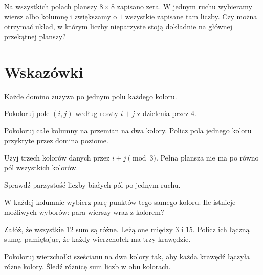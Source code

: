 \documentclass{lecture-kuznia}
\begin{document}
\begin{problem}[$\diamondsuit$]\label{Z15}
	Na wszystkich polach planszy $8\times8$ zapisano zera. W jednym ruchu
	wybieramy wiersz albo kolumnę i zwiększamy o $1$ wszystkie zapisane tam
	liczby. Czy można otrzymać układ, w którym liczby nieparzyste stoją
	dokładnie na głównej przekątnej planszy?
\end{problem}

\ifshowsolutions
\newpage
\section{Wskazówki}

\begin{hint*}[\ref{Z1}]
	Każde domino zużywa po jednym polu każdego koloru.
\end{hint*}

\begin{hint*}[\ref{Z2}]
	Pokoloruj pole $(i,j)$ według reszty $i+j$ z dzielenia przez $4$.
\end{hint*}

\begin{hint*}[\ref{Z3}]
	Pokoloruj całe kolumny na przemian na dwa kolory. Policz pola jednego
	koloru przykryte przez domina poziome.
\end{hint*}

\begin{hint*}[\ref{Z4}]
	Użyj trzech kolorów danych przez $i+j\pmod3$. Pełna plansza nie ma po
	równo pól wszystkich kolorów.
\end{hint*}

\begin{hint*}[\ref{Z5}]
	Sprawdź parzystość liczby białych pól po jednym ruchu.
\end{hint*}

\begin{hint*}[\ref{Z6}]
	W każdej kolumnie wybierz parę punktów tego samego koloru. Ile istnieje
	możliwych wyborów: para wierszy wraz z kolorem?
\end{hint*}

\begin{hint*}[\ref{Z7}]
	Załóż, że wszystkie $12$ sum są różne. Leżą one między $3$ i $15$.
	Policz ich łączną sumę, pamiętając, że każdy wierzchołek ma trzy krawędzie.
\end{hint*}

\begin{hint*}[\ref{Z8}]
	Pokoloruj wierzchołki sześcianu na dwa kolory tak, aby każda krawędź
	łączyła różne kolory. Śledź różnicę sum liczb w obu kolorach.
\end{hint*}
\end{document}
